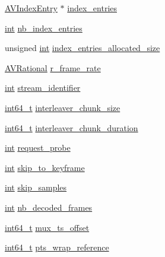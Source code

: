 \begin{DoxyCompactItemize}
\item 
\hyperlink{struct_a_v_index_entry}{A\+V\+Index\+Entry} $\ast$ \hyperlink{struct_a_v_stream_abd901928978d19dc6dee65e88f28c6ad}{index\+\_\+entries}
\item 
\hyperlink{xmltok_8h_a5a0d4a5641ce434f1d23533f2b2e6653}{int} \hyperlink{struct_a_v_stream_a79b269ebc3f36441cf8e8a8e8ea347f8}{nb\+\_\+index\+\_\+entries}
\item 
unsigned \hyperlink{xmltok_8h_a5a0d4a5641ce434f1d23533f2b2e6653}{int} \hyperlink{struct_a_v_stream_a03161c9bc3f6339876506750a9c8681f}{index\+\_\+entries\+\_\+allocated\+\_\+size}
\item 
\hyperlink{struct_a_v_rational}{A\+V\+Rational} \hyperlink{struct_a_v_stream_ad63fb11cc1415e278e09ddc676e8a1ad}{r\+\_\+frame\+\_\+rate}
\item 
\hyperlink{xmltok_8h_a5a0d4a5641ce434f1d23533f2b2e6653}{int} \hyperlink{struct_a_v_stream_a1f5662cbf07c0b0d6a190f040ba93e16}{stream\+\_\+identifier}
\item 
\hyperlink{lib-src_2ffmpeg_2win32_2stdint_8h_a67a9885ef4908cb72ce26d75b694386c}{int64\+\_\+t} \hyperlink{struct_a_v_stream_af131ef55cdd62eebd3b337c6eb261007}{interleaver\+\_\+chunk\+\_\+size}
\item 
\hyperlink{lib-src_2ffmpeg_2win32_2stdint_8h_a67a9885ef4908cb72ce26d75b694386c}{int64\+\_\+t} \hyperlink{struct_a_v_stream_a56c15542ff9ba2e0ee860cbb7532600a}{interleaver\+\_\+chunk\+\_\+duration}
\item 
\hyperlink{xmltok_8h_a5a0d4a5641ce434f1d23533f2b2e6653}{int} \hyperlink{struct_a_v_stream_ab31d9fb6014bb52726ec3144a5d11218}{request\+\_\+probe}
\item 
\hyperlink{xmltok_8h_a5a0d4a5641ce434f1d23533f2b2e6653}{int} \hyperlink{struct_a_v_stream_a097cabf56050028604b398d097c2a5a5}{skip\+\_\+to\+\_\+keyframe}
\item 
\hyperlink{xmltok_8h_a5a0d4a5641ce434f1d23533f2b2e6653}{int} \hyperlink{struct_a_v_stream_a50093ce4f0989bfbcac3d04fedc2093a}{skip\+\_\+samples}
\item 
\hyperlink{xmltok_8h_a5a0d4a5641ce434f1d23533f2b2e6653}{int} \hyperlink{struct_a_v_stream_a8937969e00c765697d7a8e55a0221e04}{nb\+\_\+decoded\+\_\+frames}
\item 
\hyperlink{lib-src_2ffmpeg_2win32_2stdint_8h_a67a9885ef4908cb72ce26d75b694386c}{int64\+\_\+t} \hyperlink{struct_a_v_stream_ae0598c5dc8ff45ac6cb56a7a23847a37}{mux\+\_\+ts\+\_\+offset}
\item 
\hyperlink{lib-src_2ffmpeg_2win32_2stdint_8h_a67a9885ef4908cb72ce26d75b694386c}{int64\+\_\+t} \hyperlink{struct_a_v_stream_a5456b9e13c27ed10d42259f46297da5d}{pts\+\_\+wrap\+\_\+reference}

\end{DoxyCompactItemize}
